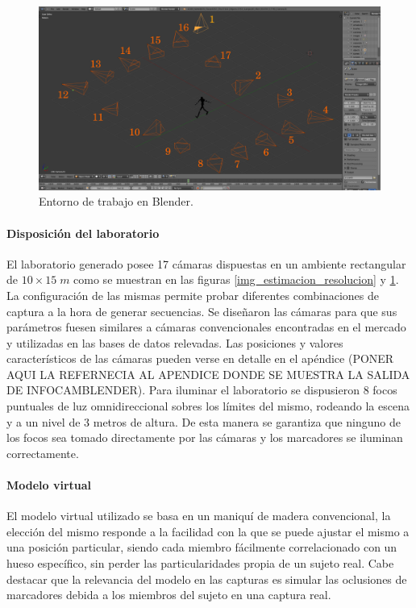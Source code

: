 \begin{figure}[H]
  \centering 
   \includegraphics[scale=0.3]{img/Base_Datos/Entorno_Blender.pdf}
   \caption{Entorno de trabajo en Blender.}
  \label{img_Entorno_Blender}
\end{figure}   


\paragraph{Disposición del laboratorio}
El laboratorio generado posee 17 cámaras dispuestas en un ambiente rectangular de $10\times15\;m $ como se muestran en las figuras \ref{img_estimacion_resolucion} y \ref{img_Entorno_Blender}. La configuración de las mismas permite probar diferentes combinaciones de captura a la hora de generar secuencias. Se diseñaron las cámaras para que sus parámetros fuesen similares a cámaras convencionales
 encontradas en el mercado y utilizadas en las bases de datos relevadas. 
 Las posiciones y valores característicos de las cámaras pueden verse en detalle en el apéndice  
 (PONER AQUI LA REFERNECIA AL APENDICE DONDE SE MUESTRA LA SALIDA DE INFOCAMBLENDER). Para iluminar el laboratorio se dispusieron $8$ focos puntuales de luz omnidireccional sobres los límites del mismo, rodeando la escena y a un nivel de 3 metros de altura. De esta manera se garantiza que ninguno de los focos sea tomado directamente por las cámaras y los marcadores se iluminan correctamente.
 

\paragraph{Modelo virtual}  
El modelo virtual utilizado se basa en un maniquí de madera convencional, la elección del mismo responde a la facilidad con la que se puede ajustar el mismo a una posición particular, siendo cada miembro fácilmente correlacionado con un hueso específico, sin perder las particularidades propia de un sujeto real. Cabe destacar que la relevancia del modelo en las capturas es simular las oclusiones de marcadores debida a los miembros del sujeto en una captura real.  

